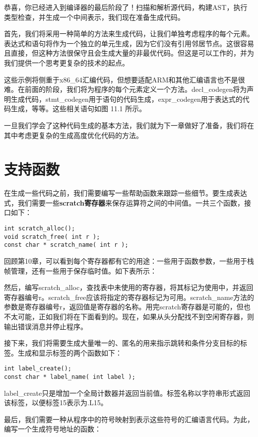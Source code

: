 \documentclass[cn,11pt,chinese]{elegantbook}
\begin{document}
恭喜，你已经进入到编译器的最后阶段了！扫描和解析源代码，构建AST，执行类型检查，并生成一个中间表示，我们现在准备生成代码。

首先，我们将采用一种简单的方法来生成代码，让我们单独考虑程序的每个元素。表达式和语句将作为一个独立的单元生成，因为它们没有引用邻居节点。这很容易且直接，但这种方法很保守且会生成大量的非最优代码。但这是可以工作的，并为我们提供一个思考更复杂的技术的起点。

这些示例将侧重于x86\_64汇编代码，但想要适配ARM和其他汇编语言也不是很难。在前面的阶段，我们将为程序的每个元素定义一个方法。decl\_codegen将为声明生成代码，stmt\_codegen用于语句的代码生成，expr\_codegen用于表达式的代码生成，等等。这些相关语句如图 11.1 所示。

一旦我们学会了这种代码生成的基本方法，我们就为下一章做好了准备，我们将在其中考虑更复杂的生成高度优化代码的方法。

\section{支持函数}

在生成一些代码之前，我们需要编写一些帮助函数来跟踪一些细节。要生成表达式，我们需要一些\textbf{scratch寄存器}来保存运算符之间的中间值。一共三个函数，接口如下：

\begin{verbatim}
int scratch_alloc();
void scratch_free( int r );
const char * scratch_name( int r );
\end{verbatim}

回顾第10章，可以看到每个寄存器都有它的用途：一些用于函数参数，一些用于栈帧管理，还有一些用于保存临时值。如下表所示：

然后，编写scratch\_alloc，查找表中未使用的寄存器，将其标记为使用中，并返回寄存器编号r。scratch\_free应该将指定的寄存器标记为可用。scratch\_name方法的参数是寄存器编号r，返回值是寄存器的名称。用完scratch寄存器是可能的，但也不太可能，正如我们将在下面看到的。现在，如果从头分配找不到空闲寄存器，则输出错误消息并停止程序。

接下来，我们将需要生成大量唯一的、匿名的用来指示跳转和条件分支目标的标签。生成和显示标签的两个函数如下：

\begin{verbatim}
int label_create();
const char * label_name( int label );
\end{verbatim}

label\_create只是增加一个全局计数器并返回当前值。标签名称以字符串形式返回该标签，以便标签15表示为.L15。

最后，我们需要一种从程序中的符号映射到表示这些符号的汇编语言代码。为此，编写一个生成符号地址的函数：
\end{document}
